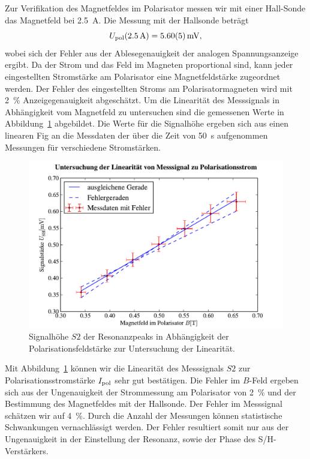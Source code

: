 \documentclass[paper=a4,
	fontsize=10pt,
	DIV=18,
	twocolumn,
	parskip=half
	]{scrartcl}
\numberwithin{equation}{section}    %
\begin{document}
Zur Verifikation des Magnetfeldes im Polarisator messen wir mit einer Hall-Sonde das Magnetfeld bei \SI{2.5}{\ampere}. Die Messung mit der Hallsonde beträgt
\begin{equation}
	U_{\rm pol}(\SI{2.5}{\ampere}) = \SI{5.60(5)}{\milli\volt},
\end{equation}
wobei sich der Fehler aus der Ablesegenauigkeit der analogen Spannungsanzeige ergibt. Da der Strom und das Feld im Magneten proportional sind, kann jeder eingestellten Stromstärke am Polarisator eine Magnetfeldstärke zugeordnet werden. Der Fehler des eingestellten Stroms am Polarisatormagneten wird mit \SI{2}{\percent} Anzeigegenauigkeit abgeschätzt.
Um die Linearität des Messsignals in Abhängigkeit vom Magnetfeld zu untersuchen sind die gemessenen Werte in Abbildung~\ref{fig.polarisationsstrom} abgebildet. Die Werte für die Signalhöhe ergeben sich aus einen linearen Fig an die Messdaten der über die Zeit von \SI{50}{\second} aufgenommen Messungen für verschiedene Stromstärken.

\begin{figure}[htp]
	\begin{center}
		\includegraphics[width=\columnwidth]{Data-Plots/04-signal-polarisationsstrom.pdf}
		\caption{Signalhöhe $S2$ der Resonanzpeaks in Abhängigkeit der Polarisationsfeldstärke zur Untersuchung der Linearität.}
		\label{fig.polarisationsstrom}
	\end{center}
\end{figure}

Mit Abbildung~\ref{fig.polarisationsstrom} können wir die Linearität des Messsignals $S2$ zur Polarisationsstromstärke $I_{\rm pol}$ sehr gut bestätigen. Die Fehler im $B$-Feld ergeben sich aus der Ungenauigkeit der Strommessung am Polarisator von \SI{2}{\percent} und der Bestimmung des Magnetfeldes mit der Hallsonde. Der Fehler im Messsignal schätzen wir auf \SI{4}{\percent}. Durch die Anzahl der Messungen können statistische Schwankungen vernachlässigt werden. Der Fehler resultiert somit nur aus der Ungenauigkeit in der Einstellung der Resonanz, sowie der Phase des S/H-Verstärkers.
\end{document}
